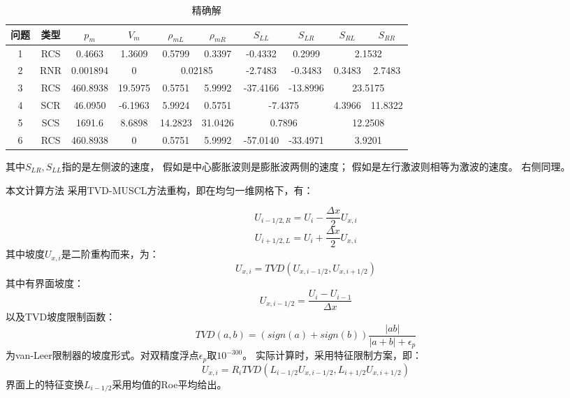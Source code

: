 \documentclass[UTF8,zihao=5]{ctexart} %
\newcommand*{\inc}[0]{{\Delta}}
\begin{document}
\begin{table}[H]
    \small
    \begin{center}
        \caption{精确解}
        \begin{tabular}{|c|c|c|c|c|c|c|c|c|c|}
            \hline
            问题 & 类型 & $p_m$    & $V_m$   & $\rho_{mL}$                   & ${\rho_{mR}}$ & $S_{LL}$                      & $S_{LR}$                      & $S_{RL}$                      & $S_{RR}$ \\
            \hline
            1    & RCS  & 0.4663   & 1.3609  & 0.5799                        & 0.3397        & -0.4332                       & 0.2999                        & \multicolumn{2}{|c|}{2.1532}             \\
            \hline
            2    & RNR  & 0.001894 & 0       & \multicolumn{2}{|c|}{0.02185} & -2.7483       & -0.3483                       & 0.3483                        & 2.7483                                   \\
            \hline
            3    & RCS  & 460.8938 & 19.5975 & 0.5751                        & 5.9992        & -37.4166                      & -13.8996                      & \multicolumn{2}{|c|}{23.5175}            \\
            \hline
            4    & SCR  & 46.0950  & -6.1963 & 5.9924                        & 0.5751        & \multicolumn{2}{|c|}{-7.4375} & 4.3966                        & 11.8322                                  \\
            \hline
            5    & SCS  & 1691.6   & 8.6898  & 14.2823                       & 31.0426       & \multicolumn{2}{|c|}{0.7896}  & \multicolumn{2}{|c|}{12.2508}                                            \\
            \hline
            6    & RCS  & 460.8938 & 0       & 0.5751                        & 5.9992        & -57.0140                      & -33.4971                      & \multicolumn{2}{|c|}{3.9201}             \\
            \hline
        \end{tabular}
    \end{center}
\end{table}

其中$S_{LR},S_{LL}$指的是左侧波的速度，
假如是中心膨胀波则是膨胀波两侧的速度；
假如是左行激波则相等为激波的速度。
右侧同理。

本文计算方法
采用TVD-MUSCL方法重构，即在均匀一维网格下，有：

$$
    U_{i-1/2,R}=U_i-\frac{\inc x}{2} U_{x,i}
$$
$$
    U_{i+1/2,L}=U_i+\frac{\inc x}{2} U_{x,i}
$$
其中坡度$U_{x,i}$是二阶重构而来，为：
$$
    U_{x,i} = TVD(U_{x,i-1/2},U_{x,i+1/2})
$$
其中有界面坡度：
$$
    U_{x,i-1/2}=\frac{U_i-U_{i-1}}{\inc x}
$$
以及TVD坡度限制函数：
$$
TVD(a,b)=(sign(a)+sign(b)) \frac{|ab|}{|a+b|+\epsilon_p}
$$
为van-Leer限制器的坡度形式。对双精度浮点$\epsilon_p$取$10^{-300}$。
实际计算时，采用特征限制方案，即：
$$
    U_{x,i} = R_{i}TVD(L_{i-1/2}U_{x,i-1/2},L_{i+1/2}U_{x,i+1/2})
$$
界面上的特征变换$L_{i-1/2}$采用均值的Roe平均给出。
\end{document}
